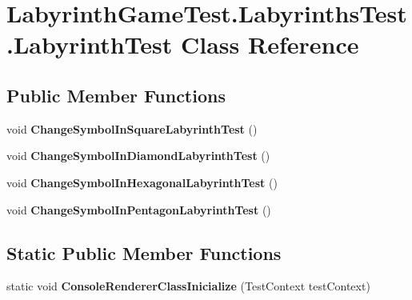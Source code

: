 \hypertarget{class_labyrinth_game_test_1_1_labyrinths_test_1_1_labyrinth_test}{\section{Labyrinth\+Game\+Test.\+Labyrinths\+Test.\+Labyrinth\+Test Class Reference}
\label{class_labyrinth_game_test_1_1_labyrinths_test_1_1_labyrinth_test}
}
\subsection*{Public Member Functions}
\begin{DoxyCompactItemize}
\item 
\hypertarget{class_labyrinth_game_test_1_1_labyrinths_test_1_1_labyrinth_test_aa19311dcd37e3d66e7eaa9da36cc37dd}{void {\bfseries Change\+Symbol\+In\+Square\+Labyrinth\+Test} ()}\label{class_labyrinth_game_test_1_1_labyrinths_test_1_1_labyrinth_test_aa19311dcd37e3d66e7eaa9da36cc37dd}

\item 
\hypertarget{class_labyrinth_game_test_1_1_labyrinths_test_1_1_labyrinth_test_ada01c1e4d52848da2f2cd523f771f1f7}{void {\bfseries Change\+Symbol\+In\+Diamond\+Labyrinth\+Test} ()}\label{class_labyrinth_game_test_1_1_labyrinths_test_1_1_labyrinth_test_ada01c1e4d52848da2f2cd523f771f1f7}

\item 
\hypertarget{class_labyrinth_game_test_1_1_labyrinths_test_1_1_labyrinth_test_a9cbcb41b802b066d1792fc24e06c0091}{void {\bfseries Change\+Symbol\+In\+Hexagonal\+Labyrinth\+Test} ()}\label{class_labyrinth_game_test_1_1_labyrinths_test_1_1_labyrinth_test_a9cbcb41b802b066d1792fc24e06c0091}

\item 
\hypertarget{class_labyrinth_game_test_1_1_labyrinths_test_1_1_labyrinth_test_ad58b363e7814874cbbc70a30e8305793}{void {\bfseries Change\+Symbol\+In\+Pentagon\+Labyrinth\+Test} ()}\label{class_labyrinth_game_test_1_1_labyrinths_test_1_1_labyrinth_test_ad58b363e7814874cbbc70a30e8305793}

\end{DoxyCompactItemize}
\subsection*{Static Public Member Functions}
\begin{DoxyCompactItemize}
\item 
\hypertarget{class_labyrinth_game_test_1_1_labyrinths_test_1_1_labyrinth_test_a8b9705b24584c755c6e10b28a3735185}{static void {\bfseries Console\+Renderer\+Class\+Inicialize} (Test\+Context test\+Context)}\label{class_labyrinth_game_test_1_1_labyrinths_test_1_1_labyrinth_test_a8b9705b24584c755c6e10b28a3735185}

\end{DoxyCompactItemize}


